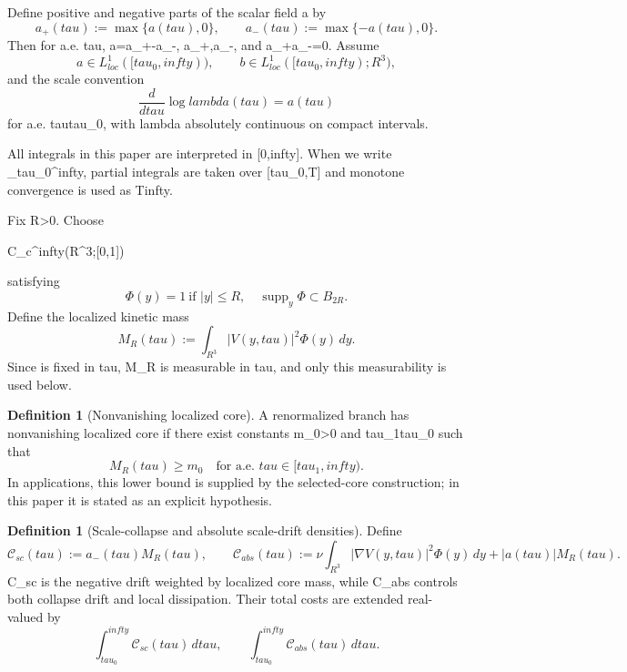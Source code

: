 \documentclass[11pt]{amsart}
\def\({}%
\def\){}%
\def\mathrm#1{#1}%
\def\mathbb#1{#1}%
\def\tau{tau}%
\def\lambda{lambda}%
\def\infty{infty}%
\theoremstyle{plain}
\theoremstyle{definition}
\newtheorem{definition}[theorem]{Definition}
\theoremstyle{remark}
\begin{document}
Define positive and negative parts of the scalar field \(a\) by
\[
  a_+(\tau):=\max\{a(\tau),0\},
  \qquad
  a_-(\tau):=\max\{-a(\tau),0\}.
\]
Then for a.e. \(\tau\), \(a=a_+-a_-\), \(a_+,a_-\), and \(a_+a_-=0\).  Assume
\[
  a\in L^1_{\mathrm{loc}}([\tau_0,\infty)),
  \qquad
  b\in L^1_{\mathrm{loc}}([\tau_0,\infty);\mathbb R^3),
\]
and the scale convention
\begin{equation}\label{eq:log-scale-convention}
  \frac{d}{d\tau}\log\lambda(\tau)=a(\tau)
\end{equation}
for a.e. \(\tau\ge\tau_0\), with \(\log\lambda\) absolutely continuous on compact intervals.

All integrals in this paper are interpreted in \([0,\infty]\). When we write
\(\int_{\tau_0}^{\infty}\), partial integrals are taken over \([\tau_0,T]\) and
monotone convergence is used as \(T\to\infty\).

Fix \(R>0\).  Choose
\(
  \Phi\in C_c^\infty(\mathbb R^3;[0,1])
\)
satisfying
\begin{equation}\label{eq:Phi-properties}
  \Phi(y)=1\ \text{if }|y|\le R,
  \quad
  \operatorname{supp}_y\Phi\subset B_{2R}.
\end{equation}
Define the localized kinetic mass
\[
  M_R(\tau):=\int_{\mathbb R^3}|V(y,\tau)|^2\Phi(y)
  \,dy.
\]
Since \(\Phi\) is fixed in \(\tau\), \(M_R\) is measurable in \(\tau\), and only this
measurability is used below.

\begin{definition}[Nonvanishing localized core]
A renormalized branch has nonvanishing localized core if there exist
constants \(m_0>0\) and \(\tau_1\ge\tau_0\) such that
\[
  M_R(\tau)\ge m_0\quad\text{for a.e. }\tau\in[\tau_1,\infty).
\]
In applications, this lower bound is supplied by the selected-core construction; in this
paper it is stated as an explicit hypothesis.
\end{definition}

\begin{definition}[Scale-collapse and absolute scale-drift densities]
Define
\[
  \mathcal C_{\mathrm{sc}}(\tau):=a_-(\tau)M_R(\tau),
  \qquad
  \mathcal C_{\mathrm{abs}}(\tau):=\nu\int_{\mathbb R^3}|\nabla V(y,\tau)|^2\Phi(y)
  \,dy+|a(\tau)|M_R(\tau).
\]
\(\mathcal C_{\mathrm{sc}}\) is the negative drift weighted by localized core mass, while
\(\mathcal C_{\mathrm{abs}}\) controls both collapse drift and local dissipation.
Their total costs are extended real-valued by
\[
  \int_{\tau_0}^{\infty}\mathcal C_{\mathrm{sc}}(\tau)
  \,d\tau,
  \qquad
  \int_{\tau_0}^{\infty}\mathcal C_{\mathrm{abs}}(\tau)
  \,d\tau.
\]
\end{definition}
\end{document}

